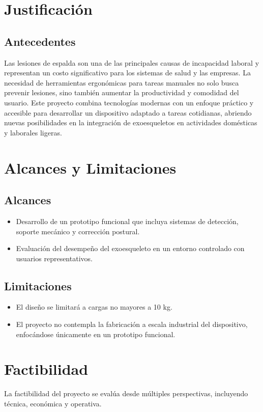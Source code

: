 \section{Justificación}
\subsection{Antecedentes}
Las lesiones de espalda son una de las principales causas de incapacidad laboral y representan un costo significativo para los sistemas de salud y las empresas. La necesidad de herramientas ergonómicas para tareas manuales no solo busca prevenir lesiones, sino también aumentar la productividad y comodidad del usuario. Este proyecto combina tecnologías modernas con un enfoque práctico y accesible para desarrollar un dispositivo adaptado a tareas cotidianas, abriendo nuevas posibilidades en la integración de exoesqueletos en actividades domésticas y laborales ligeras.


\section{Alcances y Limitaciones}
\subsection{Alcances}
\begin{itemize}
    \item Desarrollo de un prototipo funcional que incluya sistemas de detección, soporte mecánico y corrección postural.
    \item Evaluación del desempeño del exoesqueleto en un entorno controlado con usuarios representativos.
\end{itemize}

\subsection{Limitaciones}
\begin{itemize}
    \item El diseño se limitará a cargas no mayores a 10 kg.
    \item El proyecto no contempla la fabricación a escala industrial del dispositivo, enfocándose únicamente en un prototipo funcional.
\end{itemize}


\section{Factibilidad}
La factibilidad del proyecto se evalúa desde múltiples perspectivas, incluyendo técnica, económica y operativa.

